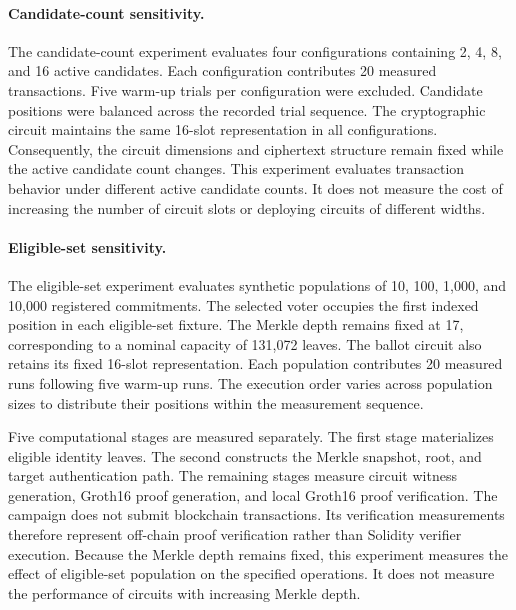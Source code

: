 \paragraph{Candidate-count sensitivity.}

The candidate-count experiment evaluates four
configurations containing 2, 4, 8, and 16
active candidates. Each configuration contributes
20 measured transactions. Five warm-up trials
per configuration were excluded. Candidate
positions were balanced across the recorded
trial sequence.
The cryptographic circuit maintains the same
16-slot representation in all configurations.
Consequently, the circuit dimensions and
ciphertext structure remain fixed while
the active candidate count changes.
This experiment evaluates transaction behavior
under different active candidate counts. It
does not measure the cost of increasing the
number of circuit slots or deploying circuits
of different widths.

\paragraph{Eligible-set sensitivity.}

The eligible-set experiment evaluates synthetic
populations of 10, 100, 1,000, and 10,000
registered commitments. The selected voter
occupies the first indexed position in each
eligible-set fixture.
The Merkle depth remains fixed at 17,
corresponding to a nominal capacity of
131,072 leaves. The ballot circuit also
retains its fixed 16-slot representation.
Each population contributes 20 measured runs
following five warm-up runs. The execution
order varies across population sizes to
distribute their positions within the
measurement sequence.

Five computational stages are measured separately.
The first stage materializes eligible identity
leaves. The second constructs the Merkle snapshot,
root, and target authentication path.
The remaining stages measure circuit witness
generation, Groth16 proof generation, and
local Groth16 proof verification.
The campaign does not submit blockchain
transactions. Its verification measurements
therefore represent off-chain proof verification
rather than Solidity verifier execution.
Because the Merkle depth remains fixed,
this experiment measures the effect of
eligible-set population on the specified
operations. It does not measure the
performance of circuits with increasing
Merkle depth.




